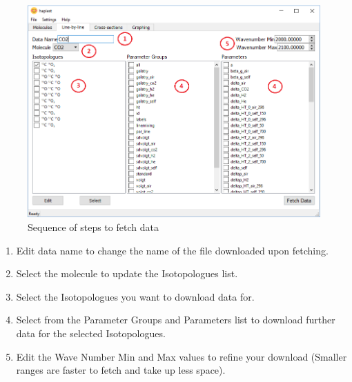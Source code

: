 \documentclass[12pt]{article}
\begin{document}
\begin{figure}[h]
\centering
\includegraphics[scale = 0.6]{hapiest_line_by_line_guide.png}
\caption{Sequence of steps to fetch data}
\label{fig:how_to_fetch}
\end{figure}

\begin{enumerate}
\item Edit data name to change the name of the file downloaded upon fetching.
\item Select the molecule to update the Isotopologues list.
\item Select the Isotopologues you want to download data for.
\item Select from the Parameter Groups and Parameters list to download further data for the selected Isotopologues.
\item Edit the Wave Number Min and Max values to refine your download (Smaller ranges are faster to fetch and take up less space).
\end{enumerate}
\end{document}
